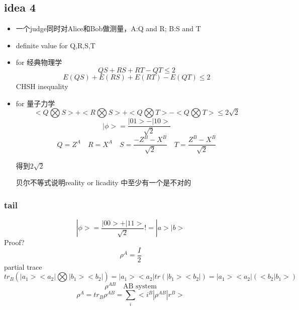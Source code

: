 \documentclass[a4paper, 11pt]{article} %
\begin{document}
\subsection{idea 4}
\begin{itemize}
\item
一个judge同时对Alice和Bob做测量，A:Q and R; B:S and T
\item
definite value for Q,R,S,T
\item
for 经典物理学
$$
QS+RS+RT-QT \leq 2
$$
$$
E(QS)+E(RS)+E(RT)-E(QT) \leq 2 
$$
CHSH inequality
\item
for 量子力学
$$
<Q\bigotimes S> + <R\bigotimes S> +<Q\bigotimes T> -<Q\bigotimes T> \leq 2\sqrt{2} 
$$
$$
|\phi> = \frac{|01>- |10>}{\sqrt{2}}
$$
$$
Q = Z^A \quad R = X^A \quad S = \frac{-Z^B - X^B}{\sqrt{2}} \quad T = \frac{Z^B - X^B}{\sqrt{2}}
$$

得到$2\sqrt{2}$

贝尔不等式说明reality or licadity 中至少有一个是不对的

\end{itemize}

\subsubsection*{tail}
$$
|\phi> = \frac{|00> + |11>}{\sqrt{2}} !=|a>|b>
$$
Proof?
$$
\rho^A = \frac{I}{2}
$$
partial trace
$$
tr_B(|a_1><a_2| \bigotimes |b_1><b_2|) = |a_1><a_2|tr(|b_1><b_2|) = |a_1><a_2|(<b_2|b_1>)
$$
$$
\rho^{AB}\quad  \mbox{AB system}
$$
$$
\rho^A = tr_B\rho^{AB} = \sum_i <i^B|\rho^{AB}|r^B>
$$
\end{document}
